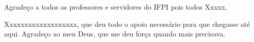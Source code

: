 \begin{agradecimentos}


\justifying

Agradeço a todos os professores e servidores do IFPI pois todos Xxxxx.

Xxxxxxxxxxxxxxxxxxx, que deu todo o apoio necessário para que chegasse até aqui. Agradeço ao meu Deus, que me deu força quando mais precisava.

\end{agradecimentos}